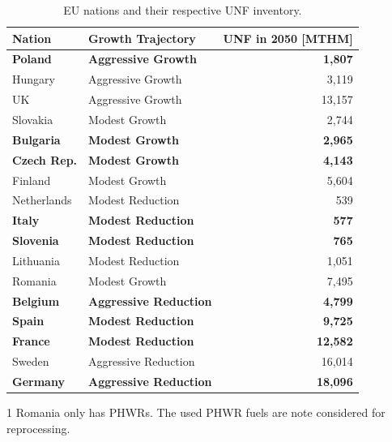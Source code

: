 \begin{table}[h]
    \centering
\begin{threeparttable}

    \caption {\gls{EU} nations and their respective \gls{UNF} inventory.} 
                \begin{tabular}{llr}
                    \hline 
                    \textbf{Nation} & \textbf{Growth Trajectory} & \small{\textbf{UNF in 2050 [MTHM] }}\\
                    \hline
                    \textbf{Poland} & \textbf{Aggressive Growth} & \textbf{1,807}\\
                    Hungary & Aggressive Growth & 3,119 \\ 
                    UK & Aggressive Growth & 13,157\\
                    Slovakia & Modest Growth & 2,744\\
                    \textbf{Bulgaria} & \textbf{Modest Growth} & \textbf{2,965} \\
                    \textbf{Czech Rep.} & \textbf{Modest Growth} & \textbf{4,143}\\
                    Finland & Modest Growth &  5,604\\
                    Netherlands & Modest Reduction & 539\\
                    \textbf{Italy} & \textbf{Modest Reduction} & \textbf{577}\\
                    \textbf{Slovenia} & \textbf{Modest Reduction} & \textbf{765}\\
                    Lithuania & Modest Reduction & 1,051 \\
                    Romania \tnote{1}  & Modest Growth & 7,495 \\
                    \textbf{Belgium} & \textbf{Aggressive Reduction} & \textbf{4,799}\\
                    \textbf{Spain} & \textbf{Modest Reduction} &  \textbf{9,725} \\
                    \textbf{France} & \textbf{Modest Reduction} & \textbf{12,582} \\
                    Sweden & Aggressive Reduction & 16,014\\
                    \textbf{Germany} & \textbf{Aggressive Reduction} & \textbf{18,096}\\
                    \hline
                \end{tabular}
    \begin{tablenotes}
    \item[1] Romania only has \glspl{PHWR}. The used \gls{PHWR} fuels are note
             considered for reprocessing.
    \end{tablenotes}

    \label{tab:which_send}

\end{threeparttable}

\end{table}


